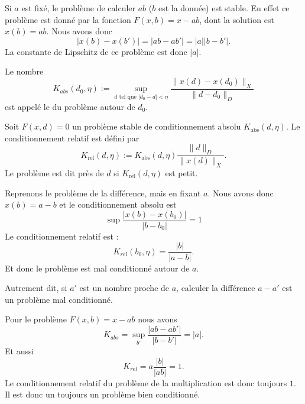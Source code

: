 \begin{example}
	Si \( a\) est fixé, le problème de calculer \( ab\) (\( b\) est la donnée) est stable. En effet ce problème est donné par la fonction \( F(x,b)=x-ab\), dont la solution est \( x(b)=ab\). Nous avons donc
	\begin{equation}
		\big| x(b)-x(b') \big|=| ab-ab' |=| a | |b-b' |.
	\end{equation}
	La constante de Lipschitz de ce problème est donc \( | a |\).
\end{example}

\begin{definition}
	Le nombre
	\begin{equation}        \label{EqDefAABSOLU}
		K_{abs}(d_0,\eta):=\sup_{d\text{ tel que }|d_0-d|<\eta}\frac{\| x(d)-x(d_0)\|_X}{\|d-d_0\|_D}
	\end{equation}
	est appelé le  du problème autour de \( d_0\).

	Soit \( F(x,d)=0\) un problème stable de conditionnement absolu \( K_{\text{abs}}(d,\eta)\).  Le conditionnement relatif est défini par
	\begin{equation}        \label{DEFEQooSXDBooYbvGrC}
		K_{\text{rel}}(d,\eta):=K_{\text{abs}}(d,\eta)\frac{\| d \|_D}{\|x(d)\|_X}.
	\end{equation}
	Le problème est dit  près de \( d\) si \( K_{\text{rel}}(d,\eta)\) est petit.
\end{definition}

\begin{example}
	Reprenons le problème de la différence, mais en fixant \( a\). Nous avons donc \( x(b)=a-b\) et le conditionnement absolu est
	\begin{equation}
		\sup\frac{ | x(b)-x(b_0) | }{ | b-b_0 | }=1
	\end{equation}
	Le conditionnement relatif est :
	\begin{equation}
		K_{rel}(b_0,\eta)=\frac{ | b | }{ | a-b | }.
	\end{equation}
	Et donc le problème est mal conditionné autour de \( a\).

	Autrement dit, si \( a'\) est un nombre proche de \( a\), calculer la différence \( a-a'\) est un problème mal conditionné.
\end{example}

\begin{example}
	Pour le problème \( F(x,b)=x-ab\) nous avons
	\begin{equation}
		K_{abs}=\sup_{b'}\frac{ | ab-ab' | }{ | b-b' | }=| a |.
	\end{equation}
	Et aussi
	\begin{equation}
		K_{rel}=a\frac{ | b | }{ | ab | }=1.
	\end{equation}
	Le conditionnement relatif du problème de la multiplication est donc toujours \( 1\). Il est donc un toujours un problème bien conditionné.
\end{example}

